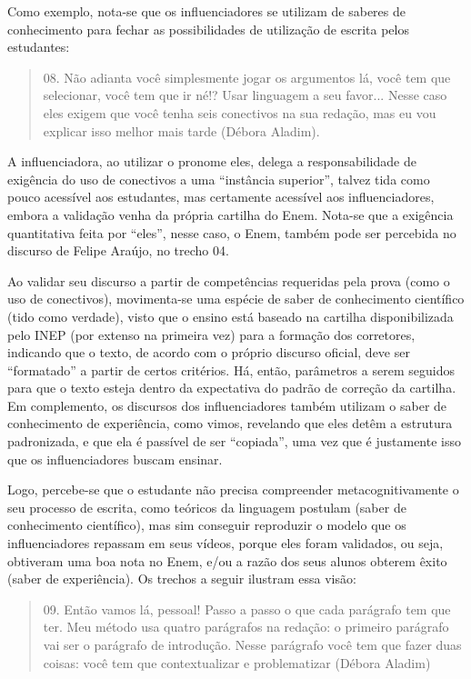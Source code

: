 \documentclass[portuguese]{textolivre}
\begin{document}
Como exemplo, nota-se que os influenciadores se utilizam de saberes de conhecimento para fechar as possibilidades de utilização de escrita pelos estudantes: 

\begin{quote}
  08. Não adianta você simplesmente jogar os argumentos lá, você tem que selecionar, você tem que ir né!? Usar linguagem a seu favor... Nesse caso eles exigem que você tenha seis conectivos na sua redação, mas eu vou explicar isso melhor mais tarde (Débora Aladim).
\end{quote}

A influenciadora, ao utilizar o pronome eles, delega a responsabilidade de exigência do uso de conectivos a uma “instância superior”, talvez tida como pouco acessível aos estudantes, mas certamente acessível aos influenciadores, embora a validação venha da própria cartilha do Enem. Nota-se que a exigência quantitativa feita por “eles”, nesse caso, o Enem, também pode ser percebida no discurso de Felipe Araújo, no trecho 04. 

Ao validar seu discurso a partir de competências requeridas pela prova (como o uso de conectivos), movimenta-se uma espécie de saber de conhecimento científico (tido como verdade), visto que o ensino está baseado na cartilha disponibilizada pelo INEP (por extenso na primeira vez) para a formação dos corretores, indicando que o texto, de acordo com o próprio discurso oficial, deve ser “formatado” a partir de certos critérios. Há, então, parâmetros a serem seguidos para que o texto esteja dentro da expectativa do padrão de correção da cartilha. Em complemento, os discursos dos influenciadores também utilizam o saber de conhecimento de experiência, como vimos, revelando que eles detêm a estrutura padronizada, e que ela é passível de ser “copiada”, uma vez que é justamente isso que os influenciadores buscam ensinar. 

Logo, percebe-se que o estudante não precisa compreender metacognitivamente o seu processo de escrita, como teóricos da linguagem postulam (saber de conhecimento científico), mas sim conseguir reproduzir o modelo que os influenciadores repassam em seus vídeos, porque eles foram validados, ou seja, obtiveram uma boa nota no Enem, e/ou a razão dos seus alunos obterem êxito (saber de experiência). Os trechos a seguir ilustram essa visão:

\begin{quote}
  09. Então vamos lá, pessoal! Passo a passo o que cada parágrafo tem que ter. Meu método usa quatro parágrafos na redação: o primeiro parágrafo vai ser o parágrafo de introdução. Nesse parágrafo você tem que fazer duas coisas: você tem que contextualizar e problematizar (Débora Aladim)
\end{quote}
\end{document}
